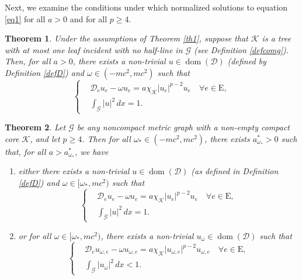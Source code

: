 \documentclass[11pt]{amsart}
\newtheorem{theorem}{Theorem}[section]
\newcommand{\abs}[1]{\lvert#1\rvert}
\newcommand{\D}{\mathcal{D}}
\newcommand{\G}{\mathcal{G}}
\newcommand{\K}{\mathcal{K}}
\numberwithin{equation}{section}
\begin{document}
Next, we examine the conditions under which normalized solutions to  equation \eqref{eq1} for all $a>0$ and for all $p\geq4$.
\begin{theorem}\label{thalla}
Under the assumptions of Theorem \ref{th1}, suppose that $\K$ is a tree with at most one leaf incident with no half-line in $\G$ (see Definition \ref{defcomg}). Then, for all $a>0$, there exists a non-trivial $u \in \operatorname{dom}(\D)$ (defined by Definition \ref{defD}) and $\omega \in (-mc^2, mc^2)$ such that
    \begin{equation*}
    \left\{\begin{aligned}
        &\D_e u_e - \omega u_e= a\chi_\K\abs{u_e}^{p-2}u_e \quad \forall e\in \mathrm{E},\\
        &\int_\G\abs{u}^2\,dx = 1.
    \end{aligned}
    \right.
\end{equation*}
\end{theorem}
\begin{theorem}
    \label{th3}
    Let $\G$ be any noncompact metric graph with a non-empty compact core $\K$, and let $p \geq 4$. Then for all $\omega_*\in(-mc^2, mc^2)$, there exists $a^*_{\omega_*}>0$ such that, for all $a>a^*_{\omega_*}$, we have\\
    \begin{enumerate}[label=\rm(\roman*)]
        \item either there exists a non-trivial $u \in \operatorname{dom}(\D)$ (as defined in Definition \ref{defD}) and $\omega \in [\omega_*, mc^2)$ such that
    \begin{equation*}
    \left\{\begin{aligned}
        &\D_e u_e - \omega u_e= a\chi_\K\abs{u_e}^{p-2}u_e \quad \forall e\in \mathrm{E},\\
        &\int_\G\abs{u}^2\,dx = 1.
    \end{aligned}
    \right.
\end{equation*}
\item  or for all $\omega \in [\omega_*, mc^2)$, there exists a non-trivial $u_\omega \in \operatorname{dom}(\D)$ such that
    \begin{equation*}
    \left\{\begin{aligned}
        &\D_e u_{\omega,e} - \omega u_{\omega,e} = a\chi_\K\abs{u_{\omega,e}}^{p-2}u_{\omega,e} \quad\forall e\in \mathrm{E},\\
        &\int_\G\abs{u_\omega}^2\,dx < 1.
    \end{aligned}
    \right.
    \end{equation*}
    \end{enumerate}
\end{theorem}
\end{document}
